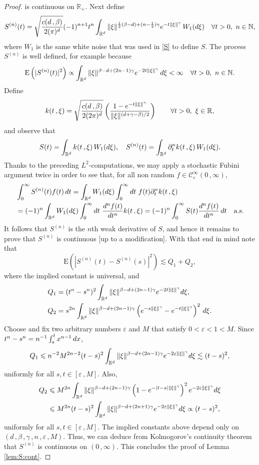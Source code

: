 \documentclass[10pt,a4paper]{amsart}
\newcommand{\E}{\mathrm{E}}
\newcommand{\N}{\mathbb{N}}
\newcommand{\R}{\mathbb{R}}
\newcommand{\cC}{\mathcal{C}}
\newcommand{\e}{{\rm e}}
\renewcommand{\d}{{\rm d}}
\renewcommand{\le}{\leqslant}
\begin{document}
\begin{proof}
	is continuous on $\R_+$. Next define
	\[
		S^{(n)}(t)
		= \sqrt{\frac{c(d\,,\beta)}{2(\pi)^d}}(-1)^{n+1} t^n \int_{\R^d} 
		\|\xi\|^{\frac12(\beta-d)+(n-\frac12)\gamma}\e^{-t\|\xi\|^\gamma}
		\,W_1(\d\xi) \quad\forall t > 0,\ n\in\N,
	\]
	where $W_1$ is the same 
	white noise that was used in \eqref{S} to define $S$. The process $S^{(n)}$ is well defined,
	for example because
	\begin{align*}
		\E\left(|S^{(n)}(t)|^2\right) \propto \int_{\R^d} 
		\|\xi\|^{\beta-d+(2n-1)\gamma} \e^{-2t\|\xi\|^\gamma}\,\d\xi
		<\infty\quad\forall t > 0,\ n\in\N.
	\end{align*}
	Define
	\[
		k(t\,,\xi) = 
		\sqrt{\frac{c(d\,,\beta)}{2(2\pi)^d}} \left(\frac{ 1 - \e^{-t\|\xi\|^\gamma}}{%
		\|\xi\|^{(d+\gamma-\beta)/2}}\right)\qquad\forall t>0,\
		\xi\in\R,
	\]
	and observe that 
	\[
		S(t)=\int_{\R^d} k(t\,,\xi)\,W_1(\d\xi),\quad
		S^{(n)}(t) = \int_{\R^d} \partial^n_t k(t\,,\xi)\, W_1(\d\xi).
	\]
	Thanks to the preceding $L^2$-computations, we may apply a stochastic Fubini
	argument twice in order to see that, for all non random $f\in\cC^\infty_c(0\,,\infty)$,
	\begin{align*}
		&\int_0^\infty S^{(n)}(t)f(t)\,\d t = \int_{\R^d} W_1(\d\xi)
			\int_0^\infty\d t\ f(t)\partial^n_t k(t\,,\xi)\\
		&= (-1)^n\int_{\R^d} W_1(\d\xi)
			\int_0^\infty\d t\ \frac{\d^n f(t)}{\d t^n} k(t\,,\xi)
			= (-1)^n\int_0^\infty S(t)\frac{\d^n f(t)}{\d t^n}\,\d t
			\quad\text{a.s.}
	\end{align*}
	It follows that $S^{(n)}$ is the $n$th weak derivative of $S$, and hence it remains to 
	prove that $S^{(n)}$ is continuous [up to a modification]. With that end in mind note that
	\[
		\E\left(|S^{(n)}(t) - S^{(n)}(s)|^2\right)\lesssim Q_1+Q_2,
	\]
	where the implied constant is universal, and
	\begin{align*}
		Q_1&= (t^n-s^n)^2 \int_{\R^d} \|\xi\|^{\beta-d+(2n-1)\gamma} \e^{-2t\|\xi\|^\gamma}\d\xi,\\
		Q_2&= s^{2n}\int_{\R^d} \|\xi\|^{\beta-d+(2n-1)\gamma}
			\left( \e^{-s\|\xi\|^\gamma} - \e^{-t\|\xi\|^\gamma}\right)^2\,\d\xi.
	\end{align*}
	Choose and fix two arbitrary numbers $\varepsilon$ and $M$ that satisfy
	$0<\varepsilon<1<M$. Since
	$t^n-s^n=n^{-1}\int_s^t x^{n-1}\,\d x$,
	\[
		Q_1 \le n^{-2}M^{2n-2}(t-s)^2\int_{\R^d} 
		\|\xi\|^{\beta-d+(2n-1)\gamma} \e^{-2\varepsilon\|\xi\|^\gamma}\d\xi
		\lesssim (t-s)^2,
	\]
	uniformly for all $s,t\in[\varepsilon\,,M]$. Also,
	\begin{align*}
		Q_2&\le M^{2n}\int_{\R^d} \|\xi\|^{\beta-d+(2n-1)\gamma}
			\left( 1-\e^{-|t-s| \|\xi\|^\gamma}\right)^2 
			\e^{-2\varepsilon\|\xi\|^\gamma}\d\xi\\
		&\le M^{2n}(t-s)^2\int_{\R^d} \|\xi\|^{\beta-d+(2n+1)\gamma}
			 \e^{-2\varepsilon\|\xi\|^\gamma}\d\xi \propto (t-s)^2,
	\end{align*}	
	uniformly for all $s,t\in[\varepsilon\,,M]$.
	The implied constants above depend only on 
	$(d\,,\beta\,,\gamma\,,n\,,\varepsilon\,,M)$.
	Thus, we can deduce from Kolmogorov's continuity theorem 
	that $S^{(n)}$ is continuous on $(0\,,\infty)$. 
	 This concludes the proof of Lemma \ref{lem:S:cont}.
\end{proof}
\end{document}
